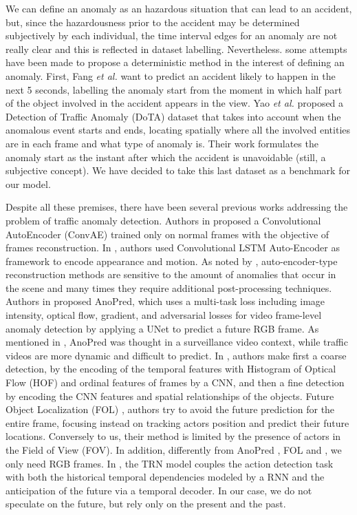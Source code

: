 We can define an anomaly as an hazardous situation that can lead to an accident, but, since the hazardousness prior to the accident may be determined subjectively by each individual, the time interval edges for an anomaly are not really clear and this is reflected in dataset labelling.
Nevertheless. some attempts have been made to propose a deterministic method in the interest of defining an anomaly.
First, Fang \emph{et al.} \cite{fang2019dada} want to predict an accident likely to happen in the next 5 seconds, labelling the anomaly start from the moment in which half part of the object involved in the accident appears in the view.
Yao \emph{et al.} \cite{yao2020when} proposed a Detection of Traffic Anomaly (DoTA) dataset that takes into account when the anomalous event starts and ends, locating spatially where all the involved entities are in each frame and what type of anomaly is.
Their work formulates the anomaly start as the instant after which the accident is unavoidable (still, a subjective concept).
We have decided to take this last dataset as a benchmark for our model.

Despite all these premises, there have been several previous works addressing the problem of traffic anomaly detection.
Authors in \cite{hasan2016learning} proposed a Convolutional AutoEncoder (ConvAE) trained only on normal frames with the objective of frames reconstruction.
In \cite{luo2017remembering, wang2018abnormal}, authors used Convolutional LSTM Auto-Encoder as framework to encode appearance and motion.
As noted by \cite{ramachandra2020survey}, auto-encoder-type reconstruction methods are sensitive to the amount of anomalies that occur in the scene and many times they require additional post-processing techniques.
Authors in \cite{liu2018future} proposed AnoPred, which uses a multi-task loss including image intensity, optical flow, gradient, and adversarial losses for video frame-level anomaly detection by applying a UNet to predict a future RGB frame.
As mentioned in \cite{9712446}, AnoPred was thought in a surveillance video context, while traffic videos are more dynamic and difficult to predict.
In \cite{zhou_spatio-temporal_2022}, authors make first a coarse detection, by the encoding of the temporal features with Histogram of Optical Flow (HOF) \cite{wang2013action} and ordinal features of frames by a CNN, and then a fine detection by encoding the CNN features and spatial relationships of the objects.
Future Object Localization (FOL) \cite{9712446}, authors try to avoid the future prediction for the entire frame, focusing instead on tracking actors position and predict their future locations.
Conversely to us, their method is limited by the presence of actors in the Field of View (FOV).
In addition, differently from AnoPred \cite{liu2018future}, FOL \cite{9712446} and \cite{zhou_spatio-temporal_2022}, we only need RGB frames.
In \cite{xu2019temporal}, the TRN model couples the action detection task with both the historical temporal dependencies modeled by a RNN and the anticipation of the future via a temporal decoder.
In our case, we do not speculate on the future, but rely only on the present and the past.

